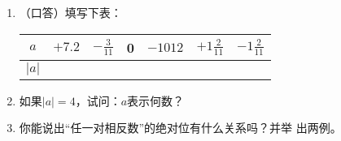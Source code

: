\begin{ex}
\begin{enumerate}
    \item （口答）填写下表：
    \begin{center}
\begin{tabular}{c|cccccc}
    \hline
$a$ & $+7.2$ & $-\frac{3}{11}$ & 0& $-1012$ &$+1\frac{2}{11}$ &$-1\frac{2}{11}$\\
   \hline
$|a|$\\
    \hline
\end{tabular}       
    \end{center}
\item 如果$|a|=4$，试问：$a$表示何数？
\item 你能说出“任一对相反数”的绝对位有什么关系吗？并举
  出两例。
\end{enumerate}
\end{ex}

